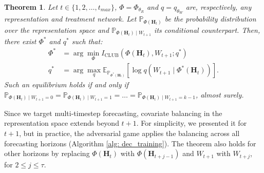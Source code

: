 \documentclass{article}
\theoremstyle{plain}
\newtheorem{theorem}{Theorem}[section]
\theoremstyle{definition}
\theoremstyle{remark}
\begin{document}
\begin{theorem}
Let $t\in \{1, 2, \dots, t_{max}\}$, $\Phi=\Phi_{\theta_R}$ and $q = q_{\theta_W}$ are, respectively, any representation and treatment network. Let $\mathbb{P}_{\Phi(\mathbf{H}_t)}$ be the probability distribution over the representation space and $\mathbb{P}_{\Phi(\mathbf{H}_t)\mid W_{t+1}}$ its conditional counterpart. Then, there exist $\Phi^*$ and $q^*$ such that:
\begin{equation}
\begin{aligned}
 \Phi^* &= \arg\min_{\Phi} I_{\text{CLUB}}(\Phi(\mathbf{H}_t), W_{t+1}; q^*)\\
 q^* &= \arg\max_{q} \mathbb{E}_{\mathbb{P}_{\Phi^*(\mathbf{H}_t)}} \left[ \log q(W_{t+1} \mid \Phi^*(\mathbf{H}_t)) \right].                  
\end{aligned}
\end{equation}
Such an equilibrium holds if and only if $\mathbb{P}_{\Phi(\mathbf{H}_t)\mid W_{t+1}=0} \!=\! \mathbb{P}_{\Phi(\mathbf{H}_t)\mid W_{t+1}=1} \!=\! \dots \!=\! \mathbb{P}_{\Phi(\mathbf{H}_t)\mid W_{t+1}=k-1}$, almost surely.
\label{thm: blancing_iclub}
\end{theorem}
Since we target multi-timestep forecasting, covariate balancing in the representation space extends beyond \( t+1 \). For simplicity, we presented it for \( t+1 \), but in practice, the adversarial game applies the balancing across all forecasting horizons (Algorithm \ref{alg: dec_training}). The theorem also holds for other horizons by replacing \( \Phi(\mathbf{H}_t) \) with \( \Phi(\mathbf{H}_{t + j -1}) \) and \( W_{t+1} \) with \( W_{t+j} \), for $2 \leq j \leq \tau$.
\end{document}
